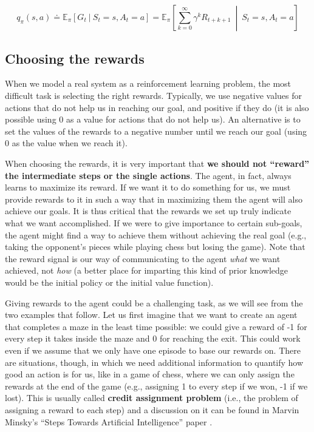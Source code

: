 \begin{equation}
    q_\pi(s,a) \doteq \mathbb{E}_\pi \left[ G_t \  \vert \  S_t = s, A_t = a \right] = \mathbb{E}_\pi \left[ \sum_{k=0}^{\infty} \gamma^k R_{t+k+1} \  \middle\vert \ S_t = s, A_t = a \right]
    \label{eq:ch2-actionvaluefunction}
\end{equation}

\subsection{Choosing the rewards}
When we model a real system as a reinforcement learning problem, the most difficult task is selecting the right rewards. Typically, we use negative values for actions that do not help us in reaching our goal, and positive if they do (it is also possible using 0 as a value for actions that do not help us). An alternative is to set the values of the rewards to a negative number until we reach our goal (using 0 as the value when we reach it).

When choosing the rewards, it is very important that \textbf{we should not ``reward'' the intermediate steps or the single actions}. The agent, in fact, always learns to maximize its reward. If we want it to do something for us, we must provide rewards to it in such a way that in maximizing them the agent will also achieve our goals. It is thus critical that the rewards we set up truly indicate what we want accomplished. If we were to give importance to certain sub-goals, the agent might find a way to achieve them without achieving the real goal (e.g., taking the opponent's pieces while playing chess but losing the game). Note that the reward signal is our way of communicating to the agent \textit{what} we want achieved, not \textit{how} (a better place for imparting this kind of prior knowledge would be the initial policy or the initial value function).

Giving rewards to the agent could be a challenging task, as we will see from the two examples that follow. Let us first imagine that we want to create an agent that completes a maze in the least time possible: we could give a reward of -1 for every step it takes inside the maze and 0 for reaching the exit. This could work even if we assume that we only have one episode to base our rewards on. There are situations, though, in which we need additional information to quantify how good an action is for us, like in a game of chess, where we can only assign the rewards at the end of the game (e.g., assigning 1 to every step if we won, -1 if we lost). This is usually called \textbf{credit assignment problem} (i.e., the problem of assigning a reward to each step) and a discussion on it can be found in Marvin Minsky’s ``Steps Towards Artificial Intelligence'' paper \cite{4066245}.


